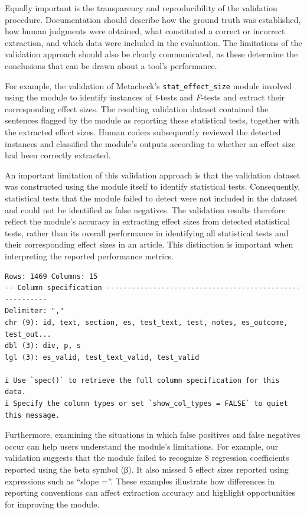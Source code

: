 \documentclass[
  letterpaper,
  12pt]{article}
\begin{document}
Equally important is the transparency and reproducibility of the
validation procedure. Documentation should describe how the ground truth
was established, how human judgments were obtained, what constituted a
correct or incorrect extraction, and which data were included in the
evaluation. The limitations of the validation approach should also be
clearly communicated, as these determine the conclusions that can be
drawn about a tool's performance.

For example, the validation of Metacheck's \texttt{stat\_effect\_size}
module involved using the module to identify instances of \emph{t}-tests
and \emph{F}-tests and extract their corresponding effect sizes. The
resulting validation dataset contained the sentences flagged by the
module as reporting these statistical tests, together with the extracted
effect sizes. Human coders subsequently reviewed the detected instances
and classified the module's outputs according to whether an effect size
had been correctly extracted.

An important limitation of this validation approach is that the
validation dataset was constructed using the module itself to identify
statistical tests. Consequently, statistical tests that the module
failed to detect were not included in the dataset and could not be
identified as false negatives. The validation results therefore reflect
the module's accuracy in extracting effect sizes from detected
statistical tests, rather than its overall performance in identifying
all statistical tests and their corresponding effect sizes in an
article. This distinction is important when interpreting the reported
performance metrics.

\begin{verbatim}
Rows: 1469 Columns: 15
-- Column specification --------------------------------------------------------
Delimiter: ","
chr (9): id, text, section, es, test_text, test, notes, es_outcome, test_out...
dbl (3): div, p, s
lgl (3): es_valid, test_text_valid, test_valid

i Use `spec()` to retrieve the full column specification for this data.
i Specify the column types or set `show_col_types = FALSE` to quiet this message.
\end{verbatim}

Furthermore, examining the situations in which false positives and false
negatives occur can help users understand the module's limitations. For
example, our validation suggests that the module failed to recognize 8
regression coefficients reported using the beta symbol (β). It also
missed 5 effect sizes reported using expressions such as ``slope =''.
These examples illustrate how differences in reporting conventions can
affect extraction accuracy and highlight opportunities for improving the
module.
\end{document}
